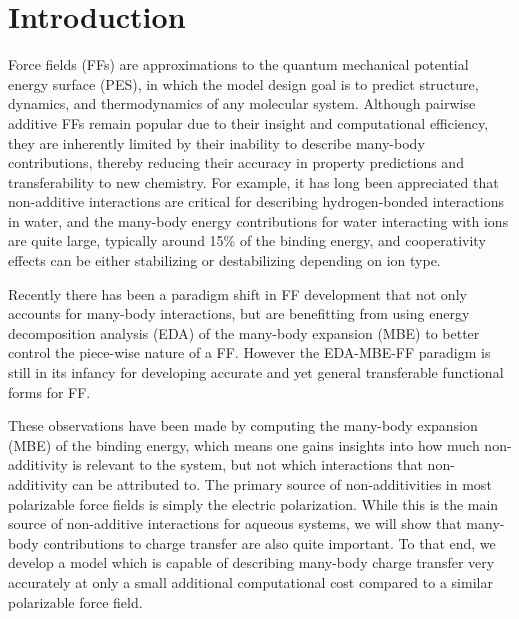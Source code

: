 \documentclass[journal=jacsat,manuscript=article]{achemso}
\begin{document}
\section{Introduction}
Force fields (FFs) are approximations to the quantum mechanical potential energy surface (PES), in which the model design goal is to predict structure, dynamics, and thermodynamics of any molecular system. Although pairwise additive FFs remain popular due to their insight and computational efficiency, they are inherently limited by their inability to describe many-body contributions, thereby reducing their accuracy in property predictions and transferability to new chemistry. For example, it has long been appreciated that non-additive interactions are critical for describing hydrogen-bonded interactions in water\cite{xantheas2000cooperativity}, and the many-body energy contributions for water interacting with ions are quite large, typically around 15\% of the binding energy, and cooperativity effects can be either stabilizing or destabilizing depending on ion type.\cite{heindel2021many,herman2021many}

Recently there has been a paradigm shift in FF development that not only accounts for many-body interactions, but are benefitting from using energy decomposition analysis (EDA) of the many-body expansion (MBE) to better control the piece-wise nature of a FF. However the EDA-MBE-FF paradigm is still in its infancy for developing accurate and yet general transferable functional forms for FF. 

These observations have been made by computing the many-body expansion (MBE) of
the binding energy\cite{heindel2020many}, which means one gains insights into how much non-additivity is relevant to the system, but not which interactions that non-additivity can be attributed to. The primary source of non-additivities in most polarizable force fields is simply the electric polarization. While this is the main source of non-additive interactions for aqueous systems, we will show that many-body contributions to charge transfer are also quite important. To that end, we develop a model which is capable of describing many-body charge transfer very accurately at only a small additional computational cost compared to a similar polarizable force field.
\end{document}
